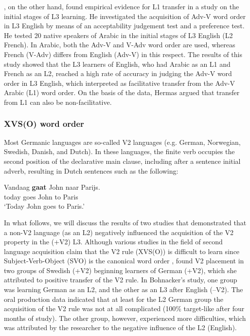\documentclass[output=paper]{langsci/langscibook}
\begin{document}
  \citet{Hermas2010}, on the other hand, found empirical evidence for L1 transfer in a study on the initial stages of L3 learning. He investigated the acquisition of Adv-V word order in L3 English by means of an acceptability judgement test and a preference test. He tested 20 native speakers of Arabic in the initial stages of L3 English (L2 French). In Arabic, both the Adv-V and V-Adv word order are used, whereas French (V-Adv) differs from English (Adv-V) in this respect. The results of this study showed that the L3 learners of English, who had Arabic as an L1 and French as an L2, reached a high rate of accuracy in judging the Adv-V word order in L3 English, which \citet{Hermas2010} interpreted as facilitative transfer from the Adv-V Arabic (L1) word order. On the basis of the data, Hermas argued that transfer from L1 can also be non-facilitative.

\subsubsection{{XVS(O)} {word} {order}}

Most Germanic languages are so-called V2 languages (e.g. German, Norwegian, Swedish, Danish, and Dutch). In these languages, the finite verb occupies the second position of the declarative main clause, including after a sentence initial adverb, resulting in Dutch sentences such as the following:

\ea%
\label{ex:stadt:1}
\gll Vandaag \textbf{gaat} John naar Parijs.\\
today goes John to Paris\\
\glt ‘Today John goes to Paris.’
\z


In what follows, we will discuss the results of two studies that demonstrated that a non-V2 language (as an L2) negatively influenced the acquisition of the V2 property in the (+V2) L3. Although various studies in the field of second language acquisition claim that the V2 rule (XVS(O)) is difficult to learn since Subject-Verb-Object (SVO) is the canonical word order \citep{KleinPerdue1997, Pienemann1998, WahlstromMcKay2001, Bohnacker2006}, \citet{Bohnacker2006} found V2 placement in two groups of Swedish (+V2) beginning learners of German (+V2), which she attributed to positive transfer of the V2 rule. In Bohnacker’s study, one group was learning German as an L2, and the other as an L3 after English (–V2). The oral production data indicated that at least for the L2 German group the acquisition of the V2 rule was not at all complicated (100\% target-like after four months of study). The other group, however, experienced more difficulties, which was attributed by the researcher to the negative influence of the L2 (English).
\end{document}
